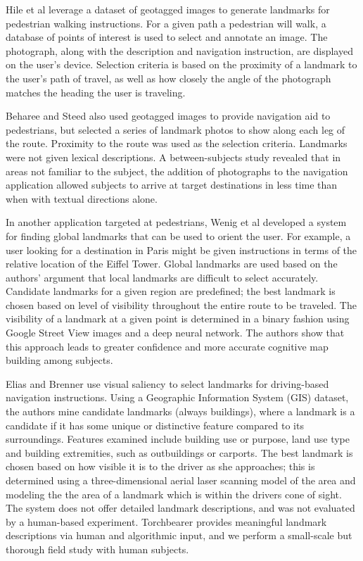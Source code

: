 Hile et al \cite{hile2008landmark} leverage a dataset of geotagged images to generate landmarks for pedestrian walking instructions. For a given path a pedestrian will walk, a database of points of interest is used to select and annotate an image. The photograph, along with the description and navigation instruction, are displayed on the user's device. Selection criteria is based on the proximity of a landmark to the user's path of travel, as well as how closely the angle of the photograph matches the heading the user is traveling.

Beharee and Steed \cite{beeharee2006natural} also used geotagged images to provide navigation aid to pedestrians, but selected a series of landmark photos to show along each leg of the route. Proximity to the route was used as the selection criteria. Landmarks were not given lexical descriptions. A between-subjects study revealed that in areas not familiar to the subject, the addition of photographs to the navigation application allowed subjects to arrive at target destinations in less time than when with textual directions alone.

In another application targeted at pedestrians, Wenig et al \cite{wenig2017pharos} developed a system for finding global landmarks that can be used to orient the user. For example, a user looking for a destination in Paris might be given instructions in terms of the relative location of the Eiffel Tower. Global landmarks are used based on the authors' argument that local landmarks are difficult to select accurately. Candidate landmarks for a given region are predefined; the best landmark is chosen based on level of visibility throughout the entire route to be traveled. The visibility of a landmark at a given point is determined in a binary fashion using Google Street View images and a deep neural network. The authors show that this approach leads to greater confidence and more accurate cognitive map building among subjects.

Elias and Brenner \cite{elias2005automatic} use visual saliency to select landmarks for driving-based navigation instructions. Using a Geographic Information System (GIS) dataset, the authors mine candidate landmarks (always buildings), where a landmark is a candidate if it has some unique or distinctive feature compared to its surroundings. Features examined include building use or purpose, land use type and building extremities, such as outbuildings or carports. The best landmark is chosen based on how visible it is to the driver as she approaches; this is determined using a three-dimensional aerial laser scanning model of the area and modeling the the area of a landmark which is within the drivers cone of sight. The system does not offer detailed landmark descriptions, and was not evaluated by a human-based experiment. Torchbearer provides meaningful landmark descriptions via human and algorithmic input, and we perform a small-scale but thorough field study with human subjects.

